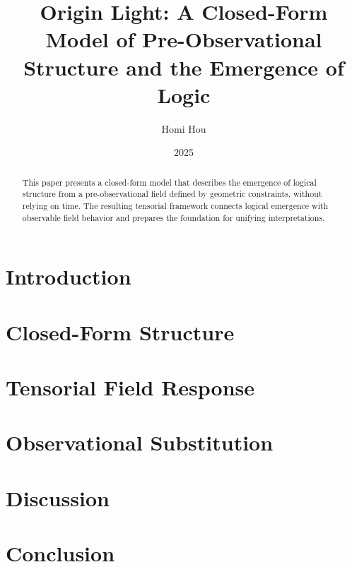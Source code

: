 \documentclass[12pt]{article}
\title{Origin Light: A Closed-Form Model of Pre-Observational Structure and the Emergence of Logic}
\author{Homi Hou}
\date{2025}
\begin{document}
\maketitle

\begin{abstract}
This paper presents a closed-form model that describes the emergence of logical structure from a pre-observational field defined by geometric constraints, without relying on time. The resulting tensorial framework connects logical emergence with observable field behavior and prepares the foundation for unifying interpretations.
\end{abstract}

\section{Introduction}

\section{Closed-Form Structure}

\section{Tensorial Field Response}

\section{Observational Substitution}

\section{Discussion}

\section{Conclusion}



\end{document}
